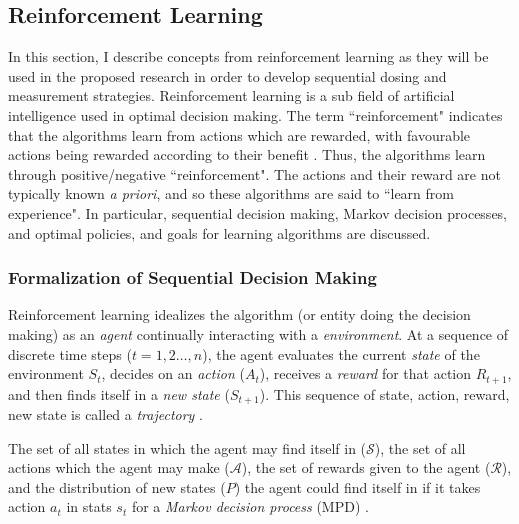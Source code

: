 \subsection{Reinforcement Learning}

In this section, I describe concepts from reinforcement learning as they will be used in the proposed research in order to develop sequential dosing and measurement strategies.  Reinforcement learning is a sub field of artificial intelligence used in optimal decision making. The term ``reinforcement" indicates that the algorithms learn from actions which are rewarded, with favourable actions being rewarded according to their benefit \cite{sutton2011reinforcement}.  Thus, the algorithms learn through positive/negative ``reinforcement".  The actions and their reward are not typically known \textit{a priori}, and so these algorithms are said to ``learn from experience".  In particular, sequential decision making, Markov decision processes, and optimal policies, and goals for learning algorithms are discussed.

\subsubsection{Formalization of Sequential Decision Making}

Reinforcement learning idealizes the algorithm (or entity doing the decision making) as an \textit{agent} continually interacting with a \textit{environment}.  At a sequence of discrete time steps  (${ t =1, 2 \dots, n} $), the agent evaluates the current \textit{state} of the environment $ S_t $, decides on an \textit{action} ($ A_t $), receives a \textit{reward} for that action $ R_{t+1} $, and then finds itself in a \textit{new state} ($ S_{t+1} $).  This sequence of state, action, reward, new state is called a \textit{trajectory} \cite{sutton2011reinforcement,lizotte2017reinforcement}. 

The set of all states in which the agent may find itself in ($\mathcal{S}$), the set of all actions which the agent may make ($\mathcal{A}$), the set of rewards given to the agent ($ \mathcal{R} $), and the distribution of new states ($ P $) the agent could find itself in if it takes action $ a_t $ in stats $ s_t $ for a \textit{Markov decision process} (MPD) \cite{sutton2011reinforcement,lizotte2017reinforcement}.

